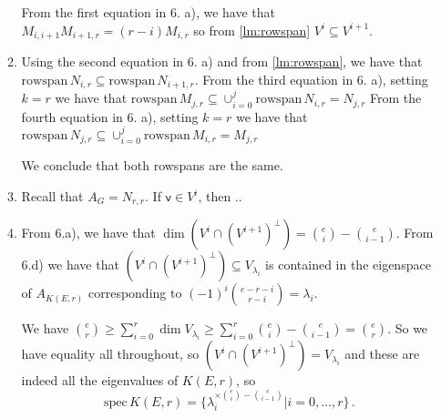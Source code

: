 \documentclass[kulak]{tplt}
\theoremstyle{definition}
\newcommand{\vv}{\mathsf{v}}
\newcommand{\rowspn}{\mathrm{rowspan}}
\newcommand{\spec}{\mathrm{spec}}
\begin{document}
\begin{enumerate}
\begin{enumerate}
From the first equation in 6. a), we have that $M_{i, i+1} M_{i+1, r} = (r-i)M_{i, r}$ so from \cref{lm:rowspan} $V^{i} \subseteq V^{i+1}$. 

\item
Using the second equation in 6. a) and from \cref{lm:rowspan}, we have that $\rowspn \,N_{i, r} \subseteq \rowspn \, N_{i+1, r}$.
From the third equation in 6. a), setting $k = r$ we have that $\rowspn \, M_{j, r} \subseteq \cup_{i=0}^j \rowspn \, N_{i, r} = N_{j, r}$
From the fourth equation in 6. a), setting $k = r$ we have that $\rowspn \, N_{j, r} \subseteq \cup_{i=0}^j \rowspn \, M_{i, r} = M_{j, r}$

We conclude that both rowspans are the same.


\item
Recall that $A_G = N_{r, r}$.
If $\vv \in V^i$, then ..

\item 
From 6.a), we have that $\dim (V^i \cap (V^{i+1})^{\perp}) = \binom{e}{i}-\binom{e}{i-1}$.
From 6.d) we have that $(V^i \cap (V^{i+1})^{\perp}) \subseteq V_{\lambda_i}$ is contained in the eigenspace of $A_{K(E, r)}$ corresponding to $(-1)^i\binom{e-r-i}{r-i} = \lambda_i$.

We have $\binom{e}{r} \geq \sum_{i=0}^r \dim V_{\lambda_i} \geq \sum_{i=0}^r \binom{e}{i}-\binom{e}{i-1} = \binom{e}{r}$.
So we have equality all throughout, so $(V^i \cap (V^{i+1})^{\perp}) = V_{\lambda_i}$ and these are indeed all the eigenvalues of $K(E, r)$, so
$$\spec \, K(E, r) = \{  \lambda_i^{\times \binom{e}{i} - \binom{e}{i-1}} | i = 0, \ldots, r\} \, . $$
\end{enumerate}

\end{enumerate}
\end{document}
